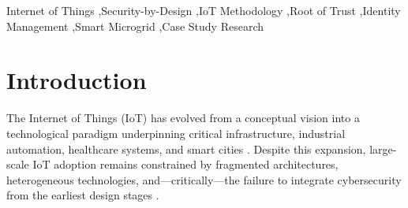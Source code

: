 \documentclass[preprint,12pt,authoryear]{elsarticle}
\begin{document}
\begin{frontmatter}
\begin{abstract}
We validate the methodology through a confirmatory case study applying all seven stages to a DC Smart Microgrid: two ESP32 nodes and a Raspberry Pi~4B coordination agent. Four case study questions assess guidance sufficiency, identity model unambiguity, Root of Trust verifiability, and threat coverage. All seven stages produced documented, traceable artifacts with no external guidance required; a 14-parameter identity model across four entity types was produced without ambiguity; the methodology achieves unweighted OWASP IoT Top~10 coverage of 6/10 items fully and 4/10 partially addressed. The Root of Trust reconstructs each node's cryptographic identity from a Physically Unclonable Function response rather than a stored key, deriving its session key from an ephemeral ECDH exchange for forward secrecy; it was validated end-to-end on real hardware for both nodes, including a detailed $N=30$ hard-reset trial (30/30 success, median handshake latency 1300\,ms, mean $1313 \pm 48$\,ms) that an independent trial on the second node confirmed generalizes across physical chips. The methodology's parameterized, technology-agnostic structure is designed to generalize across diverse IoT domains; empirical validation in additional domains remains future work.
\end{abstract}

\begin{keyword}
Internet of Things \sep Security-by-Design \sep IoT Methodology \sep Root of Trust \sep Identity Management \sep Smart Microgrid \sep Case Study Research
\end{keyword}

\end{frontmatter}


\section{Introduction}
\label{sec:introduction}

The Internet of Things (IoT) has evolved from a conceptual vision into a technological paradigm underpinning critical infrastructure, industrial automation, healthcare systems, and smart cities \citep{al2015internet, zhou2021internet}. Despite this expansion, large-scale IoT adoption remains constrained by fragmented architectures, heterogeneous technologies, and---critically---the failure to integrate cybersecurity from the earliest design stages \citep{shahinzadeh2024security, makhdoom2018anatomy}.
\end{document}
